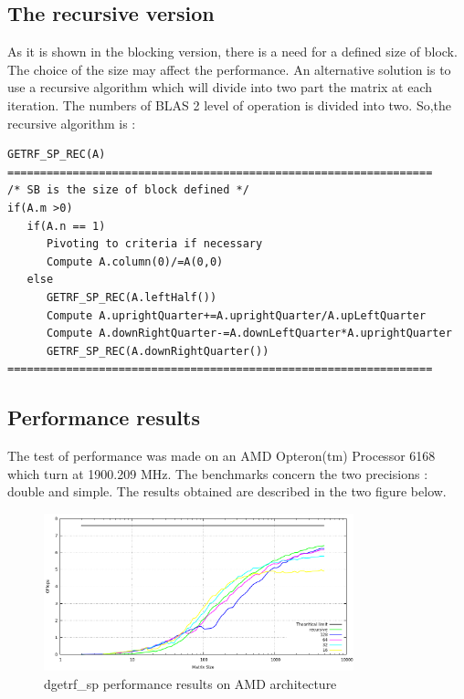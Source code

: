 \documentclass{report}
\begin{document}
\subsection{The recursive version}
As it is shown in the blocking version, there is a need for a defined size of block. The choice of the size may affect the performance. An alternative solution is to use a recursive algorithm which will divide into two part the matrix at each iteration. The numbers of BLAS 2 level of operation is divided into two. So,the recursive algorithm is :

\begin{verbatim}
GETRF_SP_REC(A)
=================================================================
/* SB is the size of block defined */
if(A.m >0)
   if(A.n == 1)
      Pivoting to criteria if necessary
      Compute A.column(0)/=A(0,0)
   else
      GETRF_SP_REC(A.leftHalf())
      Compute A.uprightQuarter+=A.uprightQuarter/A.upLeftQuarter
      Compute A.downRightQuarter-=A.downLeftQuarter*A.uprightQuarter
      GETRF_SP_REC(A.downRightQuarter())
=================================================================
\end{verbatim}


\subsection{Performance results}
The test of performance was made on an AMD Opteron(tm) Processor 6168
which turn at 1900.209 MHz. The benchmarks concern the two precisions : double and simple. The results obtained are described in the two figure below.
\begin{figure}[!ht]
\begin{center}
\includegraphics[width=0.8\textwidth]{exp_dgetrf_sp_amd.png} 
\end{center}
\caption{dgetrf\_sp performance results on AMD architecture}
\end{figure}
\end{document}
